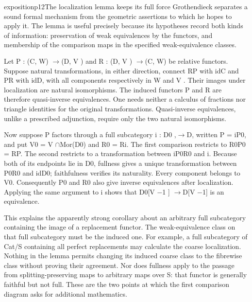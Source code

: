 \begin{dcomment}{exposition}{p12}{The localization lemma keeps its full force}
Grothendieck separates a sound formal mechanism from the geometric assertions to which he hopes to apply it. The lemma is useful precisely because its hypotheses record both kinds of information: preservation of weak equivalences by the functors, and membership of the comparison maps in the specified weak-equivalence classes.

Let P : (C, W) \ensuremath{\to}(D, V ) and R : (D, V ) \ensuremath{\to}(C, W) be relative functors. Suppose natural transformations, in either direction, connect RP with idC and PR with idD, with all components respectively in W and V . Their images under localization are natural isomorphisms. The induced functors P\textasciimacron{} and R\textasciimacron{} are therefore quasi-inverse equivalences. One needs neither a calculus of fractions nor triangle identities for the original transformations. Quasi-inverse equivalences, unlike a prescribed adjunction, require only the two natural isomorphisms.

Now suppose P factors through a full subcategory i : D0 ,\ensuremath{\to}D, written P = iP0, and put V0 = V \ensuremath{\cap}Mor(D0) and R0 = Ri. The first comparison restricts to R0P0 = RP. The second restricts to a transformation between iP0R0 and i. Because both of its endpoints lie in D0, fullness gives a unique transformation between P0R0 and idD0; faithfulness verifies its naturality. Every component belongs to V0. Consequently P0 and R0 also give inverse equivalences after localization. Applying the same argument to i shows that D0[V \ensuremath{-}1 ] \ensuremath{\to}D[V \ensuremath{-}1] is an equivalence.

This explains the apparently strong corollary about an arbitrary full subcategory containing the image of a replacement functor. The weak-equivalence class on that full subcategory must be the induced one. For example, a full subcategory of Cat/S containing all perfect replacements may calculate the coarse localization. Nothing in the lemma permits changing its induced coarse class to the fibrewise class without proving their agreement. Nor does fullness apply to the passage from splitting-preserving maps to arbitrary maps over S: that functor is generally faithful but not full. These are the two points at which the first comparison diagram asks for additional mathematics.

\end{dcomment}

